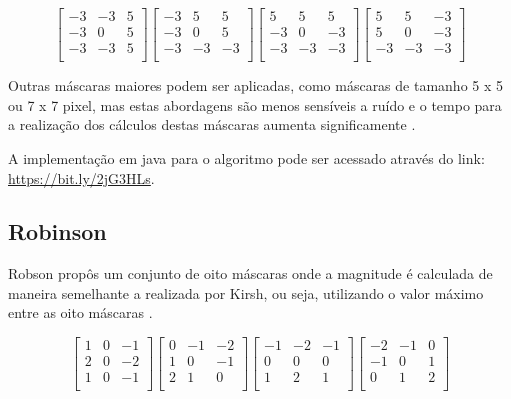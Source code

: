 \documentclass[
	12pt,				%
	oneside,			%
	a4paper,			%
	english,			%
	french,				%
	spanish,			%
	brazil,				%
	]{abntex2}
\begin{document}
\[
\begin{bmatrix}
    -3 & -3 &  5   \\ 
	-3 &  0 &  5   \\ 
	-3 & -3 &  5   \\ 
\end{bmatrix} 
\begin{bmatrix}
    -3 &  5 &  5   \\ 
	-3 &  0 &  5   \\ 
	-3 & -3 & -3   \\ 
\end{bmatrix}
\begin{bmatrix}
     5 &  5 &  5   \\ 
	-3 &  0 & -3   \\ 
	-3 & -3 & -3   \\ 
\end{bmatrix} 
\begin{bmatrix}
     5 &  5 & -3   \\ 
	 5 &  0 & -3   \\ 
	-3 & -3 & -3   \\ 
\end{bmatrix}
\]

Outras máscaras maiores podem ser aplicadas, como máscaras de tamanho 5 x 5 ou 7 x 7 pixel, mas estas abordagens são menos sensíveis a ruído e o tempo para a realização dos cálculos destas máscaras aumenta significamente \cite{pedriniSchwartz:2008}.

A implementação em java para o algoritmo pode ser acessado através do link: \url{https://bit.ly/2jG3HLs}.

\subsection{Robinson}
Robson propôs um conjunto de oito máscaras onde a magnitude é calculada de maneira semelhante a realizada por Kirsh, ou seja, utilizando o valor máximo entre as oito máscaras \cite{pedriniSchwartz:2008}. 

\[
\begin{bmatrix}
     1 &  0 & -1   \\ 
	 2 &  0 & -2   \\ 
	 1 &  0 & -1   \\ 
\end{bmatrix} 
\begin{bmatrix}
     0 & -1 & -2   \\ 
	 1 &  0 & -1   \\ 
	 2 &  1 &  0   \\ 
\end{bmatrix}
\begin{bmatrix}
    -1 & -2 & -1   \\ 
	 0 &  0 &  0   \\ 
	 1 &  2 &  1   \\ 
\end{bmatrix} 
\begin{bmatrix}
    -2 & -1 &  0   \\ 
	-1 &  0 &  1   \\ 
	 0 &  1 &  2   \\ 
\end{bmatrix}
\]
\end{document}
